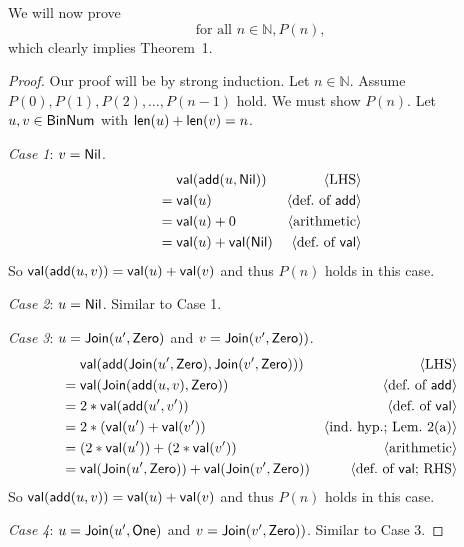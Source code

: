 \documentclass[11pt,fleqn]{article}
\newcommand{\mname}[1]{\mbox{\sf #1}}
\newcommand{\pnote}[1]{{\langle \text{#1} \rangle}}
\begin{document}
We will  now prove \[\text{for  all $n \in \mathbb{N},  P(n)$,}\] which
clearly implies Theorem~1.

\begin{proof}
Our proof will be by strong induction.  Let $n \in \mathbb{N}$. Assume
$P(0), P(1), P(2),\ldots, P(n-1)$ hold.  We must show $P(n)$.  Let
$u,v \in \mname{BinNum}$ with $\mname{len}(u) + \mname{len}(v) = n$.

\emph{Case 1}: $v =\mname{Nil}$. 
\begin{align*}
  &\phantom{{}={}} \mname{val}(\mname{add}(u,\mname{Nil})) & \pnote{LHS}\\
  &= \mname{val}(u)                            & \pnote{def.\ of \mname{add}}\\
  &= \mname{val}(u) + 0                        & \pnote{arithmetic}\\
  &= \mname{val}(u) + \mname{val}(\mname{Nil}) & \pnote{def.\ of \mname{val}}
\end{align*}
So $\mname{val}(\mname{add}(u,v)) = \mname{val}(u) + \mname{val}(v)$
and thus $P(n)$ holds in this case.

\medskip

\emph{Case 2}: $u = \mname{Nil}$.  Similar to Case 1.

\medskip

\emph{Case 3}: $u = \mname{Join}(u',\mname{Zero})$ and $v =
\mname{Join}(v', \mname{Zero}))$.
\begin{align*}
  &\phantom{{}={}} \mname{val}(\mname{add}(\mname{Join}(u',\mname{Zero}), 
    \mname{Join}(v',\mname{Zero})))
    & \pnote{LHS}\\
  &= \mname{val}(\mname{Join}(\mname{add}(u,v),\mname{Zero}))
    & \pnote{def.\ of \mname{add}}\\
  &= 2 * \mname{val}(\mname{add}(u',v'))
    & \pnote{def.\ of \mname{val}}\\
  &= 2 * (\mname{val}(u') + \mname{val}(v'))
    & \pnote{ind.\ hyp.; Lem.\ 2(a)}\\
  &= (2 * \mname{val}(u')) + (2 * \mname{val}(v'))
    & \pnote{arithmetic}\\
  &= \mname{val}(\mname{Join}(u',\mname{Zero})) + 
     \mname{val}(\mname{Join}(v',\mname{Zero}))
    & \pnote{def.\ of \mname{val}; RHS}
\end{align*}
So $\mname{val}(\mname{add}(u,v)) = \mname{val}(u) + \mname{val}(v)$
and thus $P(n)$ holds in this case.

\medskip

\emph{Case 4}: $u = \mname{Join}(u',\mname{One})$ and $v =
\mname{Join}(v', \mname{Zero}))$.  Similar to Case 3.


\end{proof}
\end{document}
